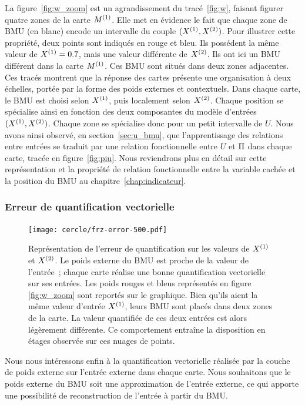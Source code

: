 \documentclass[../main]{subfiles}
\begin{document}
La figure~\ref{fig:w_zoom} est un agrandissement du tracé~\ref{fig:w}, faisant figurer quatre zones de la carte $M^{({1})}$. Elle met en évidence le fait que chaque zone de BMU (en blanc) encode un intervalle du couple $(X^{({1})}, X^{({2})})$.
Pour illustrer cette propriété, deux points sont indiqués en rouge et bleu. Ils possédent la même valeur de $X^{({1})} = 0.7$, mais une valeur différente de $X^{({2})}$. 
Ils ont ici un BMU différent dans la carte $M^{({1})}$. Ces BMU sont situés dans deux zones adjacentes.
Ces tracés montrent que la réponse des cartes présente une organisation à deux échelles, portée par la forme des poids externes et contextuels. 
Dans chaque carte, le BMU est choisi selon $X^{({1})}$, puis localement selon $X^{({2})}$.
Chaque position se spécialise ainsi en fonction des deux composantes du modèle d'entrées $(X^{({1})}, X^{({2})})$. 
Chaque zone se spécialise donc pour un petit intervalle de $U$.
Nous avons ainsi observé, en section~\ref{sec:u_bmu}, que l'apprentissage des relations entre entrées se traduit par une relation fonctionnelle entre $U$ et $\Pi$ dans chaque carte, tracée en figure~\ref{fig:piu}. 
Nous reviendrons plus en détail sur cette représentation et la propriété de relation fonctionnelle entre la variable cachée et la position du BMU au chapitre~\ref{chap:indicateur}. 

\subsubsection{Erreur de quantification vectorielle}

\begin{figure}
	\centering\texttt{[image: cercle/frz-error-500.pdf]}
	\caption{Représentation de l'erreur de quantification sur les valeurs de $X^{({1})}$ et $X^{({2})}$. Le poids externe du BMU est proche de la valeur de l'entrée~; chaque carte réalise une bonne quantification vectorielle sur ses entrées. 
	Les poids rouges et bleus représentés en figure \ref{fig:w_zoom} sont reportés sur le graphique. Bien qu'ils aient la même valeur d'entrée $X^{({1})}$, leurs BMU sont placés dans deux zones de la carte. La valeur quantifiée de ces deux entrées est alors légèrement différente. Ce comportement entraîne la disposition en étages observée sur ces nuages de points. \label{fig:qv}}
\end{figure}

Nous nous intéressons enfin à la quantification vectorielle réalisée par la couche de poids externe sur l'entrée externe dans chaque carte. Nous souhaitons que le poids externe du BMU soit une approximation de l'entrée externe, ce qui apporte une possibilité de reconstruction de l'entrée à partir du BMU.
\end{document}
